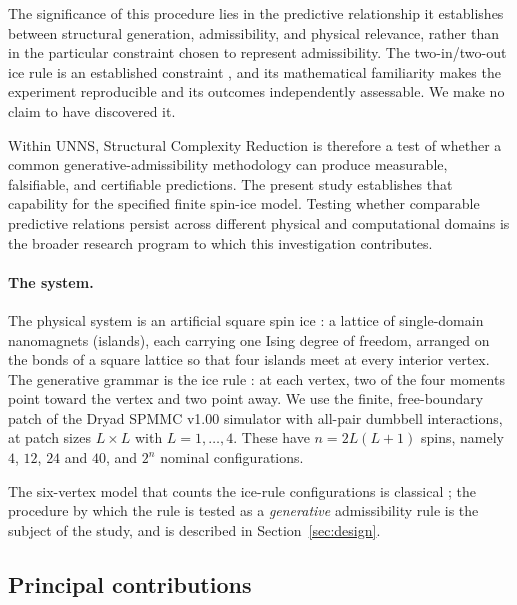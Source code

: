 \documentclass[11pt,a4paper]{article}
\theoremstyle{plain}
\theoremstyle{definition}
\theoremstyle{remark}
\begin{document}
The significance of this procedure lies in the predictive relationship it establishes between structural generation, admissibility, and physical relevance, rather than in the particular constraint chosen to represent admissibility. The two-in/two-out ice rule is an established constraint \cite{BernalFowler1933,Pauling1935,Lieb1967}, and its mathematical familiarity makes the experiment reproducible and its outcomes independently assessable. We make no claim to have discovered it.

Within UNNS, Structural Complexity Reduction is therefore a test of whether a common generative-admissibility methodology can produce measurable, falsifiable, and certifiable predictions. The present study establishes that capability for the specified finite spin-ice model. Testing whether comparable predictive relations persist across different physical and computational domains is the broader research program to which this investigation contributes.

\paragraph{The system.}
The physical system is an artificial square spin ice \cite{Wang2006,Nisoli2013}: a lattice of single-domain nanomagnets (islands), each carrying one Ising degree of freedom, arranged on the bonds of a square lattice so that four islands meet at every interior vertex. The generative grammar is the ice rule \cite{BernalFowler1933,Pauling1935}: at each vertex, two of the four moments point toward the vertex and two point away. We use the finite, free-boundary patch of the Dryad SPMMC v1.00 simulator \cite{Hurben2026} with all-pair dumbbell interactions, at patch sizes $L\times L$ with $L=1,\dots,4$. These have $n=2L(L+1)$ spins, namely $4$, $12$, $24$ and $40$, and $2^{n}$ nominal configurations.

The six-vertex model that counts the ice-rule configurations is classical \cite{Lieb1967}; the procedure by which the rule is tested as a \emph{generative} admissibility rule is the subject of the study, and is described in Section~\ref{sec:design}.

\subsection{Principal contributions}
\end{document}
